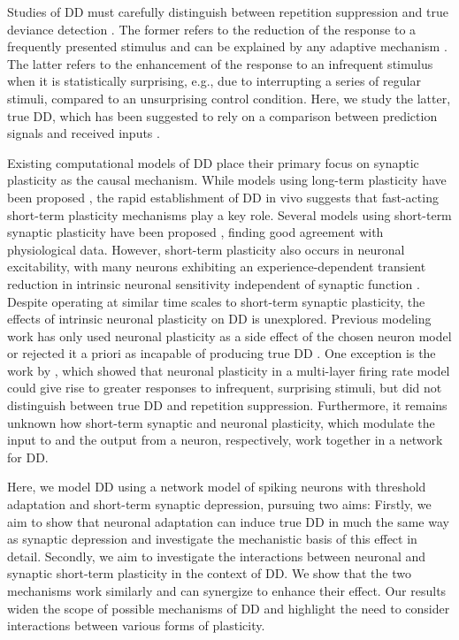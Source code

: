 \documentclass[9pt,lineno,onehalfspacing]{elife}
\begin{document}
Studies of DD must carefully distinguish between repetition suppression and true deviance detection \citep{Ross2020-qf}. The former refers to the reduction of the response to a frequently presented stimulus and can be explained by any adaptive mechanism \citep{May2010-qn, Garagnani2011-eu}. The latter refers to the enhancement of the response to an infrequent stimulus when it is statistically surprising, e.g., due to interrupting a series of regular stimuli, compared to an unsurprising control condition. Here, we study the latter, true DD, which has been suggested to rely on a comparison between prediction signals and received inputs \citep{Parras2017-fp, Carbajal2018-sd, Ross2020-qf}. 

Existing computational models of DD place their primary focus on synaptic plasticity as the causal mechanism. While models using long-term plasticity have been proposed \citep{Wacongne2012-ah, Hertag2020-kc}, the rapid establishment of DD in vivo \citep{Taaseh2011-gg} suggests that fast-acting short-term plasticity mechanisms play a key role. Several models using short-term synaptic plasticity have been proposed \citep{Mill2011-ah, May2015-lt, Yarden2017-eh}, finding good agreement with physiological data. However, short-term plasticity also occurs in neuronal excitability, with many neurons exhibiting an experience-dependent transient reduction in intrinsic neuronal sensitivity independent of synaptic function \citep{Sanchez-Vives2000-df, Henze2001-xd, Sanchez-Aguilera2014-fd}. Despite operating at similar time scales to short-term synaptic plasticity, the effects of intrinsic neuronal plasticity on DD is unexplored.  Previous modeling work has only used neuronal plasticity as a side effect of the chosen neuron model \citep{Mill2011-ah} or rejected it a priori as incapable of producing true DD \citep{Yarden2017-eh}. One exception is the work by \cite{Garagnani2011-eu}, which showed that neuronal plasticity in a multi-layer firing rate model could give rise to greater responses to infrequent, surprising stimuli, but did not distinguish between true DD and repetition suppression. Furthermore, it remains unknown how short-term synaptic and neuronal plasticity, which modulate the input to and the output from a neuron, respectively, work together in a network for DD. 

Here, we model DD using a network model of spiking neurons with threshold adaptation and short-term synaptic depression, pursuing two aims: Firstly, we aim to show that neuronal adaptation can induce true DD in much the same way as synaptic depression and investigate the mechanistic basis of this effect in detail. Secondly, we aim to investigate the interactions between neuronal and synaptic short-term plasticity in the context of DD. We show that the two mechanisms work similarly and can synergize to enhance their effect. Our results widen the scope of possible mechanisms of DD and highlight the need to consider interactions between various forms of plasticity.
\end{document}
